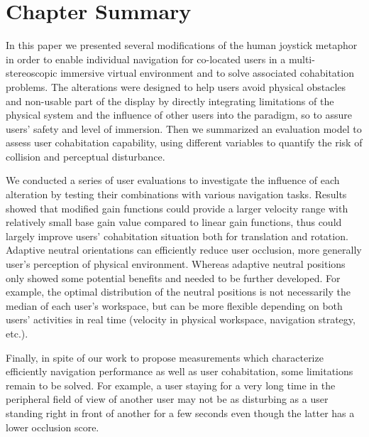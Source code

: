 \section{Chapter Summary}
In this paper we presented several modifications of the human joystick metaphor in order to enable individual navigation for co-located users in a multi-stereoscopic immersive virtual environment and to solve associated cohabitation problems. The alterations were designed to help users avoid physical obstacles and non-usable part of the display by directly integrating limitations of the physical system and the influence of other users into the paradigm, so to assure users' safety and level of immersion. Then we summarized an evaluation model to assess user cohabitation capability, using different variables to quantify the risk of collision and perceptual disturbance.

We conducted a series of user evaluations to investigate the influence of each alteration by testing their combinations with various navigation tasks. Results showed that modified gain functions could provide a larger velocity range with relatively small base gain value compared to linear gain functions, thus could largely improve users' cohabitation situation both for translation and rotation. Adaptive neutral orientations can efficiently reduce user occlusion, more generally user's perception of physical environment. Whereas adaptive neutral positions only showed some potential benefits and needed to be further developed. For example, the optimal distribution of the neutral positions is not necessarily the median of each user's workspace, but can be more flexible depending on both users' activities in real time (velocity in physical workspace, navigation strategy, etc.).

Finally, in spite of our work to propose measurements which characterize efficiently navigation performance as well as user cohabitation, some limitations remain to be solved. For example, a user staying for a very long time in the peripheral field of view of another user may not be as disturbing as a user standing right in front of another for a few seconds even though the latter has a lower occlusion score.